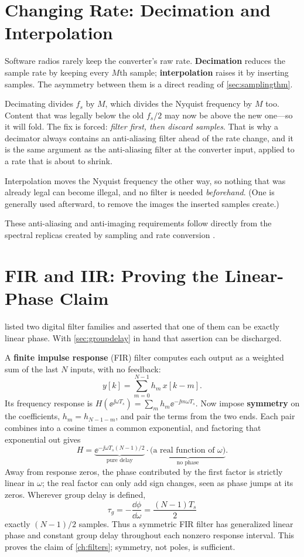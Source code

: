 \section{Changing Rate: Decimation and Interpolation}
\label{sec:decimation}
Software radios rarely keep the converter's raw rate. \textbf{Decimation} reduces the
sample rate by keeping every \(M\)th sample; \textbf{interpolation} raises it by
inserting samples. The asymmetry between them is a direct reading of
\cref{sec:samplingthm}.

Decimating divides \(f_s\) by \(M\), which divides the Nyquist frequency by \(M\) too.
Content that was legally below the old \(f_s/2\) may now be above the new one---so it
will fold. The fix is forced: \emph{filter first, then discard samples}. That is why a
decimator always contains an anti-aliasing filter ahead of the rate change, and it is
the same argument as the anti-aliasing filter at the converter input, applied to a rate
that is about to shrink.

Interpolation moves the Nyquist frequency the other way, so nothing that was already
legal can become illegal, and no filter is needed \emph{beforehand}. (One is generally
used afterward, to remove the images the inserted samples create.)

These anti-aliasing and anti-imaging requirements follow directly from the spectral
replicas created by sampling and rate conversion
\cite[pp.~23--26]{giannini2008baseband}.

\section{FIR and IIR: Proving the Linear-Phase Claim}
\label{sec:firiir}
 listed two digital filter families and asserted that one of them can
be exactly linear phase. With \cref{sec:groupdelay} in hand that assertion can be
discharged.

A \textbf{finite impulse response} (FIR) filter computes each output as a weighted sum
of the last \(N\) inputs, with no feedback:
\[
y[k]=\sum_{m=0}^{N-1}h_m\,x[k-m].
\]
Its frequency response is \(H(\ee^{\jj\omega T_s})=\sum_m h_m\ee^{-\jj m\omega T_s}\).
Now impose \textbf{symmetry} on the coefficients, \(h_m=h_{N-1-m}\), and pair the terms
from the two ends. Each pair combines into a cosine times a common exponential, and
factoring that exponential out gives
\[
H=\underbrace{\ee^{-\jj\omega T_s(N-1)/2}}_{\text{pure delay}}
\cdot\underbrace{\bigl(\text{a real function of }\omega\bigr)}_{\text{no phase}} .
\]
Away from response zeros, the phase contributed by the first factor is strictly
linear in \(\omega\); the real factor can only add sign changes, seen as phase jumps
at its zeros. Wherever group delay is defined,
\[
\tau_g=-\frac{\dd\phi}{\dd\omega}=\frac{(N-1)T_s}{2}
\]
exactly \((N-1)/2\) samples. Thus a symmetric FIR filter has generalized linear
phase and constant group delay throughout each nonzero response interval. This
proves the claim of \cref{ch:filters}; symmetry, not poles, is sufficient.

